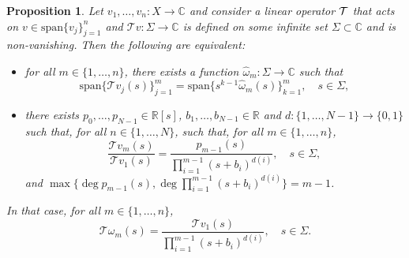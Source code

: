 \documentclass[10pt,a4paper]{amsart}
\newtheorem{prop}{Proposition}
\newcommand{\C}{\mathbb{C}}
\newcommand{\R}{\mathbb{R}}
\newcommand{\T}[1]{\mathcal{T}#1}
\newcommand{\om}{\omega}
\newcommand{\spn}[1]{\text{span}\{#1\}}
\begin{document}
\begin{prop} \label{DT_ALG}
    Let $v_1,\dots,v_n:X\to\C$ and consider a linear operator $\T$ that acts on $v\in \spn{v_j}_{j=1}^n$ and $\T{v}:\Sigma\to\C$ is defined on some infinite set $\Sigma\subset\C$ and is non-vanishing. Then the following are equivalent: 
    \begin{itemize}
        \item[$i)$] for all $m\in\{1,\dots,n\}$, there exists a function $\hat{\om}_m:\Sigma\to\C$ such that
        $$\spn{\T{v_j}(s)}_{j=1}^{m} = \spn{ s^{k-1} \hat{\om}_m(s)}_{k=1}^{m},\quad s\in\Sigma,$$
        \item[$ii)$] there exists $p_0,\dots,p_{N-1}\in\R[s]$, $b_1,\dots,b_{N-1}\in\R$ and $d:\{1,\dots,N-1\}\to\{0,1\}$ such that, for all $n\in\{1,\dots,N\}$, such that, for all $m\in\{1,\dots,n\}$,
        $$ \frac{\T{v_m}(s)}{\T{v_1}(s)} = \frac{p_{m-1}(s)}{\prod_{i=1}^{m-1}(s+b_i)^{d(i)}},\quad s\in\Sigma, $$
    and $\max\{\deg p_{m-1}(s),\deg \prod_{i=1}^{m-1}(s+b_i)^{d(i)}\}=m-1$.
    \end{itemize}
    In that case, for all $m\in\{1,\dots,n\}$,
    $$ \T{\om_m}(s) = \frac{\T{v_1}(s)}{\prod_{i=1}^{m-1} (s+b_i)^{d(i)}},\quad s\in\Sigma.$$
\end{prop}
\end{document}
